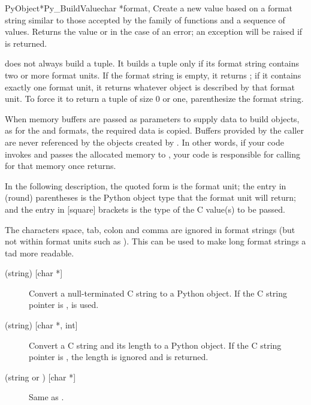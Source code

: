 \begin{cfuncdesc}{PyObject*}{Py_BuildValue}{char *format,
                                            \moreargs}
  Create a new value based on a format string similar to those
  accepted by the  family of functions and a
  sequence of values.  Returns the value or \NULL{} in the case of an
  error; an exception will be raised if \NULL{} is returned.

   does not always build a tuple.  It
  builds a tuple only if its format string contains two or more format
  units.  If the format string is empty, it returns ; if it
  contains exactly one format unit, it returns whatever object is
  described by that format unit.  To force it to return a tuple of
  size 0 or one, parenthesize the format string.

  When memory buffers are passed as parameters to supply data to build
  objects, as for the  and  formats, the required
  data is copied.  Buffers provided by the caller are never referenced
  by the objects created by .  In other
  words, if your code invokes  and passes the
  allocated memory to , your code is
  responsible for calling  for that memory once
   returns.

  In the following description, the quoted form is the format unit;
  the entry in (round) parentheses is the Python object type that the
  format unit will return; and the entry in [square] brackets is the
  type of the C value(s) to be passed.

  The characters space, tab, colon and comma are ignored in format
  strings (but not within format units such as ).  This can
  be used to make long format strings a tad more readable.

  \begin{description}
    \item[ (string) {[char *]}]
    Convert a null-terminated C string to a Python object.  If the C
    string pointer is \NULL,  is used.

    \item[ (string) {[char *, int]}]
    Convert a C string and its length to a Python object.  If the C
    string pointer is \NULL, the length is ignored and  is
    returned.

    \item[ (string or ) {[char *]}]
    Same as .


\end{description}
\end{cfuncdesc}
